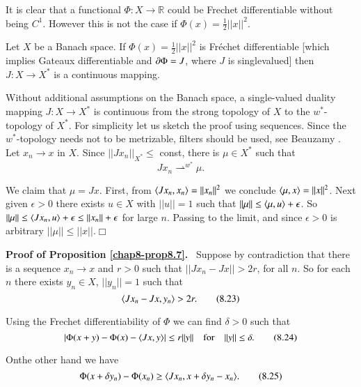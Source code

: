 It is clear that a functional $\Phi:X\to \mathbb{R}$ could be Frechet
differentiable without being $C^{1}$. However this is not the case if
$\Phi(x)=\frac{1}{2}||x||^{2}$. 

\begin{proposition}\label{chap8-prop8.7}
Let $X$ be a Banach space. If $\Phi(x)=\frac{1}{2}||x||^{2}$ is
Fr\'echet differentiable [which implies Gateaux differentiable and $\partial
  \Phi=J$, where $J$ is singlevalued] then $J:X\to X^{*}$ is a
continuous mapping.
\end{proposition}

\begin{remark*}
Without additional assumptions on the Banach space, a single-valued
duality mapping $J:X\to X^{*}$ is continuous from the strong topology
of $X$ to the $w^{*}$-topology of $X^{*}$. For simplicity let us
sketch the proof using sequences. Since the $w^{*}$-topology needs not
to be metrizable, filters should be used, see Beauzamy
\cite[p. 177]{key24}. Let $x_{n}\to x$ in $X$. Since
$||Jx_{n}||_{X^{*}}\leq$ const, there is $\mu\in X^{*}$ such that
$$
Jx_{n}\displaystyle{\mathop{\rightharpoonup}^{w^{*}}}\mu. 
$$

We claim that $\mu=Jx$. First, from $\langle
Jx_{n},x_{n}\rangle=||x_{n}||^{2}$ we conclude $\langle
\mu,x\rangle=||x||^{2}$. Next given $\epsilon>0$ there exists $u\in X$
with $||u||=1$ such that $||\mu||\leq \langle \mu,u\rangle+\epsilon$. So
$||\mu||\leq \langle Jx_{n},u\rangle+\epsilon\leq ||x_{n}||+\epsilon$ for
large $n$. Passing to the limit, and since $\epsilon>0$ is arbitrary
$||\mu||\leq ||x||$.\hfill$\Box$
\end{remark*}

\noindent
{\bf Proof of Proposition \ref{chap8-prop8.7}.}~ Suppose by
contradiction that there is a sequence $x_{n}\to x$ and $r>0$ such
that $||Jx_{n}-Jx||>2r$, for all $n$. So for each $n$ there exists
$y_{n}\in X$, $||y_{n}||=1$ such that
\begin{equation*}
\langle Jx_{n}-Jx,y_{n}\rangle>2r.\tag{8.23}\label{chap8-eq8.23}
\end{equation*}

Using the Frechet differentiability of $\Phi$ we can find $\delta>0$
such that 
\begin{equation*}
|\Phi(x+y)-\Phi(x)-\langle Jx,y\rangle|\leq r||y||\quad\text{for}\quad ||y||\leq
\delta.\tag{8.24}\label{chap8-eq8.24} 
\end{equation*}

On\pageoriginale the other hand we have
\begin{equation*}
\Phi(x+\delta y_{n})-\Phi(x_{n})\geq \langle Jx_{n},x+\delta
y_{n}-x_{n}\rangle.\tag{8.25}\label{chap8-eq8.25} 
\end{equation*}


